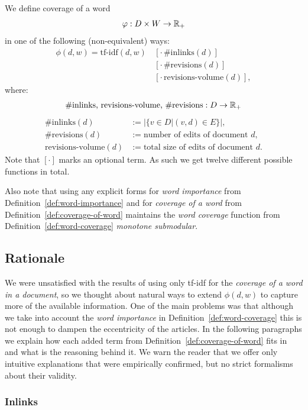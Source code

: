 \begin{definition}
  \label{def:coverage-of-word}
  We define coverage of a word
  \[\varphi : D \times W \to \mathbb{R}_+\]
  in one of the following (non-equivalent) ways:
  \begin{align*}
    \phi(d, w) = \text{tf-idf}(d, w)\, &[\cdot\, \text{\#inlinks}(d)] \\
        &[\cdot\, \text{\#revisions}(d)] \\
        &[\cdot\, \text{revisions-volume}(d)],
  \end{align*}
  where:
  \[\text{\#inlinks, revisions-volume, \#revisions} : D \to \mathbb{R}_+\]
  \begin{align*}
    \text{\#inlinks}(d) &:= |\{v \in D | (v, d) \in E\}|, \\
    \text{\#revisions}(d) &:= \text{number of edits of document } d, \\
    \text{revisions-volume}(d) &:= \text{total size of edits of document } d.
  \end{align*}
  Note that \([\cdot]\) marks an optional term. As such we get twelve different
  possible functions in total.
\end{definition}
Also note that using any explicit forms for \emph{word importance} from
Definition~\ref{def:word-importance} and for \emph{coverage of a word} from
Definition~\ref{def:coverage-of-word} maintains the \emph{word coverage}
function from Definition~\vref{def:word-coverage} \emph{monotone submodular}.

\subsection{Rationale}

We were unsatisfied with the results of using only tf-idf for the
\emph{coverage of a word in a document}, so we thought about natural ways to
extend \(\phi(d, w)\) to capture more of the available information.
One of the main problems was that although we take into account the \emph{word
importance} in Definition~\ref{def:word-coverage} this is not enough to dampen
the eccentricity of the articles.
In the following paragraphs we explain how each added term from
Definition~\ref{def:coverage-of-word} fits in and what is the reasoning behind
it.
We warn the reader that we offer only intuitive explanations that were
empirically confirmed, but no strict formalisms about their validity.

\subsubsection{Inlinks}

